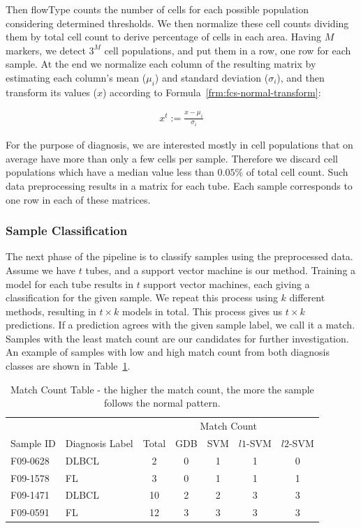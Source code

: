 Then flowType counts the number of cells for each possible population considering determined thresholds. We then normalize these cell counts dividing them by total cell count to derive percentage of cells in each area. Having $M$ markers, we detect $3^M$ cell populations, and put them in a row, one row for each sample. At the end we normalize each column of the resulting matrix by estimating each column's mean ($\mu_i$) and standard deviation ($\sigma_i$), and then transform its values ($x$) according to Formula~\ref{frm:fcs-normal-transform}:

\begin{align}
  x^t := \frac{x - \mu_i}{\sigma_i}
  \label{frm:fcs-normal-transform}
\end{align}

For the purpose of diagnosis, we are interested mostly in cell populations that on average have more than only a few cells per sample. Therefore we discard cell populations which have a median value less than $0.05\%$ of total cell count. Such data preprocessing results in a matrix for each tube. Each sample corresponds to one row in each of these matrices.

\subsubsection{Sample Classification}
The next phase of the pipeline is to classify samples using the preprocessed data. Assume we have $t$ tubes, and a support vector machine is our method. Training a model for each tube results in $t$ support vector machines, each giving a classification for the given sample. We repeat this process using $k$ different methods, resulting in $t \times k$ models in total. This process gives us $t \times k$ predictions. If a prediction agrees with the given sample label, we call it a match. Samples with the least match count are our candidates for further investigation. An example of samples with low and high match count from both diagnosis classes are shown in Table~\ref{fig:fcs-qa-matchcount}.

\begin{table}[!ht]
  \centering
  \begin{tabular}{llccccc}
    & & \multicolumn{5}{c}{Match Count} \\ \cline{3-7}
    Sample ID & Diagnosis Label & Total & GDB & SVM & $l1$-SVM & $l2$-SVM \\ \hline
    F09-0628 & DLBCL & 2 & 0 & 1 & 1 & 0 \\
    F09-1578 & FL & 3 & 0 & 1 & 1 & 1 \\
    F09-1471 & DLBCL & 10 & 2 & 2 & 3 & 3 \\
    F09-0591 & FL & 12 & 3 & 3 & 3 & 3 
  \end{tabular}
  \caption{Match Count Table - the higher the match count, the more the sample follows the normal pattern.}
  \label{fig:fcs-qa-matchcount}
\end{table}

